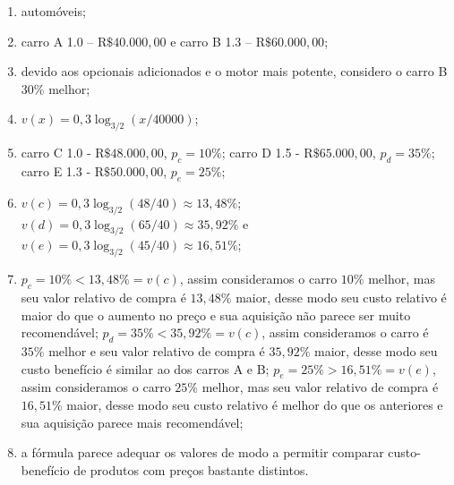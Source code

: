 \documentclass[10 pt,usenames,dvipsnames, oneside]{article}
\begin{document}
\ifdefined\prof
\begin{solucao}

\begin{enumerate}
	\item automóveis;
	\item carro A 1.0 – R$\$ 40.000{,}00$ e carro B 1.3 – R$\$60.000{,}00$;
	\item devido aos opcionais adicionados e o motor mais potente, considero o carro B 30$\%$ melhor;
	\item $v(x) = 0{,}3\log_{3/2}\left(x/40000\right)$;
	\item carro C 1.0 - R$\$ 48.000{,}00$, $p_c=10\%$; carro D 1.5 - R$\$ 65.000{,}00$, $p_d=35\%$; carro E 1.3 - R$\$ 50.000{,}00$, $p_e=25\%$;
	\item $v(c) = 0{,}3\log_{3/2}\left(48/40\right) \approx 13{,}48\%$; $v(d) = 0{,}3\log_{3/2}\left(65/40\right) \approx 35{,}92\%$ e $v(e) = 0{,}3\log_{3/2}\left(45/40\right) \approx 16{,}51\%$;
	\item $p_c = 10\% < 13{,}48\% = v(c)$, assim consideramos o carro $10\%$ melhor, mas seu valor relativo de compra é $13{,}48\%$ maior, desse modo seu custo relativo é maior do que o aumento no preço e sua aquisição não parece ser muito recomendável; $p_d = 35\% < 35{,}92\% = v(c)$, assim consideramos o carro é $35\%$ melhor e seu valor relativo de compra é $35{,}92\%$ maior, desse modo seu custo benefício é similar ao dos carros A e B; $p_e = 25\% > 16{,}51\% = v(e)$, assim consideramos o carro $25\%$ melhor, mas seu valor relativo de compra é $16{,}51\%$ maior, desse modo seu custo relativo é melhor do que os anteriores e sua aquisição parece mais recomendável;
	\item a fórmula parece adequar os valores de modo a permitir comparar custo-benefício de produtos com preços bastante distintos. 
	\end{enumerate}

\end{solucao}
\fi
\end{document}
